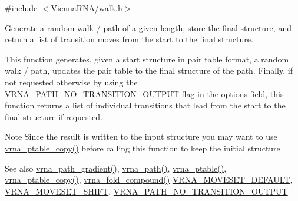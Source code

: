 {\ttfamily \#include $<$\mbox{\hyperlink{walk_8h}{Vienna\+R\+N\+A/walk.\+h}}$>$}



Generate a random walk / path of a given length, store the final structure, and return a list of transition moves from the start to the final structure. 

This function generates, given a start structure in pair table format, a random walk / path, updates the pair table to the final structure of the path. Finally, if not requested otherwise by using the \mbox{\hyperlink{group__paths_ga1ee63e54ecf136491e12ff03ede2622d}{V\+R\+N\+A\+\_\+\+P\+A\+T\+H\+\_\+\+N\+O\+\_\+\+T\+R\+A\+N\+S\+I\+T\+I\+O\+N\+\_\+\+O\+U\+T\+P\+UT}} flag in the {\ttfamily options} field, this function returns a list of individual transitions that lead from the start to the final structure if requested.

\begin{DoxyNote}{Note}
Since the result is written to the input structure you may want to use \mbox{\hyperlink{group__struct__utils_ga2daefbbd6d9f8803731651882f54332d}{vrna\+\_\+ptable\+\_\+copy()}} before calling this function to keep the initial structure
\end{DoxyNote}
\begin{DoxySeeAlso}{See also}
\mbox{\hyperlink{group__paths_gae92cce443a8a64f7b7fb89867b7d6125}{vrna\+\_\+path\+\_\+gradient()}}, \mbox{\hyperlink{group__paths_gab6aee4143f8b103518d5cbfe6bfe5eae}{vrna\+\_\+path()}}, \mbox{\hyperlink{group__struct__utils_gae829fb8bb7f694c12a9c0bbc34c77c60}{vrna\+\_\+ptable()}}, \mbox{\hyperlink{group__struct__utils_ga2daefbbd6d9f8803731651882f54332d}{vrna\+\_\+ptable\+\_\+copy()}}, \mbox{\hyperlink{group__fold__compound_ga6601d994ba32b11511b36f68b08403be}{vrna\+\_\+fold\+\_\+compound()}} \mbox{\hyperlink{group__neighbors_gaa5ffec4dd0d02df320f123e6888154d1}{V\+R\+N\+A\+\_\+\+M\+O\+V\+E\+S\+E\+T\+\_\+\+D\+E\+F\+A\+U\+LT}}, \mbox{\hyperlink{group__neighbors_ga68ea27c81de4b74e48b775c04052590b}{V\+R\+N\+A\+\_\+\+M\+O\+V\+E\+S\+E\+T\+\_\+\+S\+H\+I\+FT}}, \mbox{\hyperlink{group__paths_ga1ee63e54ecf136491e12ff03ede2622d}{V\+R\+N\+A\+\_\+\+P\+A\+T\+H\+\_\+\+N\+O\+\_\+\+T\+R\+A\+N\+S\+I\+T\+I\+O\+N\+\_\+\+O\+U\+T\+P\+UT}}
\end{DoxySeeAlso}


